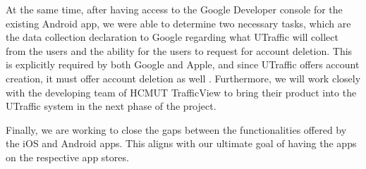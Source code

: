 At the same time, after having access to the Google Developer console for the existing Android app, we were able to determine two necessary tasks, which are the data collection declaration to Google regarding what UTraffic will collect from the users and the ability for the users to request for account deletion. This is explicitly required by both Google and Apple, and since UTraffic offers account creation, it must offer account deletion as well \cite{apple_account_deletion} \cite{google_account_deletion}. Furthermore, we will work closely with the developing team of HCMUT TrafficView to bring their product into the UTraffic system in the next phase of the project.

Finally, we are working to close the gaps between the functionalities offered by the iOS and Android apps. This aligns with our ultimate goal of having the apps on the respective app stores. 
